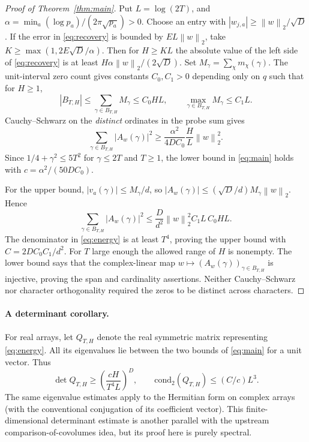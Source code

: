 \documentclass[11pt]{article}
\theoremstyle{remark}\newtheorem{remark}[theorem]{Remark}
\newcommand{\norm}[1]{\left\lVert #1\right\rVert}\newcommand{\abs}[1]{\left|#1\right|}
\begin{document}
\begin{proof}[Proof of Theorem~\ref{thm:main}]
Put $L=\log(2T)$, and $\alpha=\min_a(\log p_a)/(2\pi\sqrt{p_a})>0$. Choose an entry with $|w_{j,a}|\ge\norm{w}_2/\sqrt D$. If the error in \eqref{eq:recovery} is bounded by $E L\norm{w}_2$, take $K\ge \max(1,2E\sqrt D/\alpha)$. Then for $H\ge KL$ the absolute value of the left side of \eqref{eq:recovery} is at least $H\alpha\norm{w}_2/(2\sqrt D)$. Set $M_\gamma=\sum_\chi m_\chi(\gamma)$. The unit-interval zero count gives constants $C_0,C_1>0$ depending only on $q$ such that for $H\ge1$,
\[
 |B_{T,H}|\le\sum_{\gamma\in B_{T,H}}M_\gamma\le C_0 HL,
 \qquad \max_{\gamma\in B_{T,H}}M_\gamma\le C_1L.
\]
Cauchy--Schwarz on the \emph{distinct} ordinates in the probe sum gives
\begin{equation}\label{eq:lower}
 \sum_{\gamma\in B_{T,H}}|A_w(\gamma)|^2\ge
 \frac{\alpha^2}{4DC_0}\frac{H}{L}\norm{w}_2^2.
\end{equation}
Since $1/4+\gamma^2\le5T^2$ for $\gamma\le2T$ and $T\ge1$, the lower bound in \eqref{eq:main} holds with $c=\alpha^2/(50 DC_0)$.

For the upper bound, $|v_a(\gamma)|\le M_\gamma/d$, so $|A_w(\gamma)|\le(\sqrt D/d)M_\gamma\norm{w}_2$. Hence
\[
 \sum_{\gamma\in B_{T,H}}|A_w(\gamma)|^2\le
 \frac{D}{d^2}\norm{w}_2^2 C_1 L\,C_0 HL.
\]
The denominator in \eqref{eq:energy} is at least $T^4$, proving the upper bound with $C=2DC_0 C_1/d^2$. For $T$ large enough the allowed range of $H$ is nonempty. The lower bound says that the complex-linear map $w\mapsto(A_w(\gamma))_{\gamma\in B_{T,H}}$ is injective, proving the span and cardinality assertions. Neither Cauchy--Schwarz nor character orthogonality required the zeros to be distinct across characters.
\end{proof}

\paragraph{A determinant corollary.} For real arrays, let $Q_{T,H}$ denote the real symmetric matrix representing \eqref{eq:energy}. All its eigenvalues lie between the two bounds of \eqref{eq:main} for a unit vector. Thus
\[
 \det Q_{T,H}\ge\left(\frac{cH}{T^4 L}\right)^D,
 \qquad \mathrm{cond}_2(Q_{T,H})\le (C/c)L^3 .
\]
The same eigenvalue estimates apply to the Hermitian form on complex arrays (with the conventional conjugation of its coefficient vector). This finite-dimensional determinant estimate is another parallel with the upstream comparison-of-covolumes idea, but its proof here is purely spectral.
\end{document}

